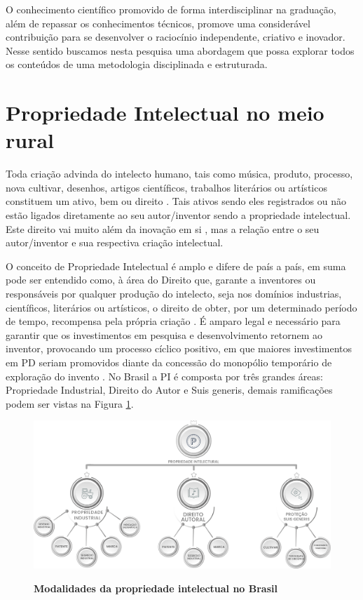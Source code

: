 O conhecimento científico promovido de forma interdisciplinar na graduação, além de repassar os conhecimentos técnicos, promove uma considerável contribuição para se desenvolver o raciocínio independente, criativo e inovador. Nesse sentido buscamos nesta pesquisa uma abordagem que possa explorar todos os conteúdos de uma metodologia disciplinada e estruturada.


\section{Propriedade Intelectual no meio rural}

Toda criação advinda do intelecto humano, tais como música, produto, processo, nova cultivar, desenhos, artigos científicos, trabalhos literários ou artísticos constituem um ativo, bem ou direito \cite{costa_interseccao_2011}. Tais ativos sendo eles registrados ou não estão ligados diretamente ao seu autor/inventor sendo a propriedade  intelectual. Este direito vai muito além da inovação em si \cite{wipo_tratado_1970}, mas a relação entre o seu autor/inventor e sua respectiva criação intelectual. 


O conceito de Propriedade Intelectual é amplo e difere de país a país, em suma pode ser entendido como, à área do Direito que, garante a inventores ou responsáveis por qualquer produção do intelecto, seja nos domínios industrias, científicos, literários ou artísticos, o direito de obter, por um determinado período de tempo, recompensa pela própria criação \cite{aspi_aspi_2019}. É amparo legal e necessário para garantir que os investimentos em pesquisa e desenvolvimento retornem ao inventor, provocando um processo cíclico positivo, em que maiores investimentos em PD seriam promovidos diante da concessão do monopólio temporário de exploração do invento \cite{lima_sauglobal_2017}. No Brasil a PI é composta por três grandes áreas: Propriedade Industrial, Direito do Autor e Suis generis, demais ramificações podem ser vistas na Figura \ref{figura_4}.


\begin{figure}[h!]
\centering
\caption{\textbf{Modalidades da propriedade intelectual no Brasil}}
\includegraphics[scale=0.5]{Imagens/propriedade_intelectual.png}
\label{figura_4}
\end{figure}
\newpage

